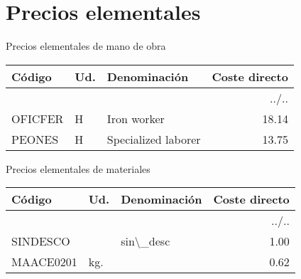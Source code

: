 \documentclass{book}%
\begin{document}
%
\normalsize%
\part{Precios elementales}%
\label{sec:Precioselementales}%
\begin{center}
%
\Large%
 Precios elementales de mano de obra %
\normalsize%
\end{center}
%
\small%
\begin{longtable}{|l|l|p{4cm}|r|}%
\hline%
Código&Ud.&Denominación&Coste directo\\%
\hline%
\endhead%
\hline%
\multicolumn{4}{|r|}{../..}\\%
\hline%
\endfoot%
\hline%
\endlastfoot%
OFICFER&H&Iron worker&18.14\\%
PEONES&H&Specialized laborer&13.75\\%
\end{longtable}%
\normalsize%
\begin{center}
%
\Large%
 Precios elementales de materiales %
\normalsize%
\end{center}
%
\small%
\begin{longtable}{|l|l|p{4cm}|r|}%
\hline%
Código&Ud.&Denominación&Coste directo\\%
\hline%
\endhead%
\hline%
\multicolumn{4}{|r|}{../..}\\%
\hline%
\endfoot%
\hline%
\endlastfoot%
SINDESCO&&sin\textbackslash{}\_desc&1.00\\%
MAACE0201&kg.&&0.62\\%
\end{longtable}%
\normalsize

%
\end{document}
